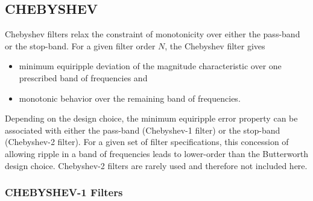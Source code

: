 \documentclass{sebase}
\begin{document}
\subsection{CHEBYSHEV}

Chebyshev filters relax the constraint of monotonicity over either the
pass-band or the stop-band. For a given filter order $N$, the Chebyshev
filter gives

\begin{itemize}
\item minimum equiripple deviation of the magnitude characteristic over one
prescribed band of frequencies and

\item monotonic behavior over the remaining band of frequencies.
\end{itemize}

Depending on the design choice, the minimum equiripple error property can be
associated with either the pass-band (Chebyshev-1 filter) or the stop-band
(Chebyshev-2 filter). For a given set of filter specifications, this
concession of allowing ripple in a band of frequencies leads to lower-order
than the Butterworth design choice. Chebyshev-2 filters are rarely used and
therefore not included here.

\subsubsection{CHEBYSHEV-1 Filters}
\end{document}
